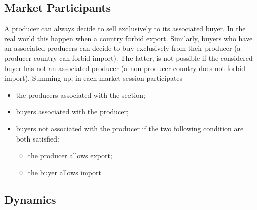 \documentclass{article}
\begin{document}
\subsection{Market Participants}
A producer can always decide to sell exclusively to its associated buyer. In the real world this happen when a country forbid export. Similarly, buyers who have an associated producers can decide to buy exclusively from their producer (a producer country can forbid import). The latter, is not possible if the considered buyer has not an associated producer (a non producer country does not forbid import). 
Summing up, in each market session participates 
\begin{itemize}
	\item the producers associated with the section;
	\item buyers associated with the producer;
	\item buyers not associated with the producer if the two following condition are both satisfied:
		\begin{itemize}
			\item the producer allows export;
			\item the buyer allows import
		\end{itemize}
\end{itemize}

\subsection{Dynamics}
\end{document}
